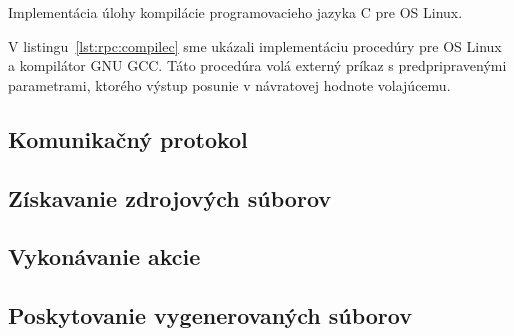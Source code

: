 \begin{listing}[H]
  \inputminted[frame=lines,framesep=2mm,linenos,fontsize=\scriptsize,firstline=20,lastline=47]{go}{/home/pepol/src/imterra/forge/worker/tasks/tasks.go}
  \caption[Implementácia kompilácie jazyka C]{Implementácia úlohy kompilácie programovacieho jazyka C pre OS Linux.}
  \label{lst:rpc:compilec}
\end{listing}


V listingu~\ref{lst:rpc:compilec} sme ukázali implementáciu procedúry pre OS Linux
a kompilátor GNU GCC\@. Táto procedúra volá externý príkaz s predpripravenými parametrami,
ktorého výstup posunie v návratovej hodnote volajúcemu.

\subsection{Komunika\v{c}n\'{y} protokol}
\label{sec:slave:protocol}

\subsection{Z\'{i}skavanie zdrojov\'{y}ch s\'{u}borov}
\label{sec:slave:retrieval}

\subsection{Vykon\'{a}vanie akcie}
\label{sec:slave:execution}

\subsection{Poskytovanie vygenerovan\'{y}ch s\'{u}borov}
\label{sec:slave:provision}
